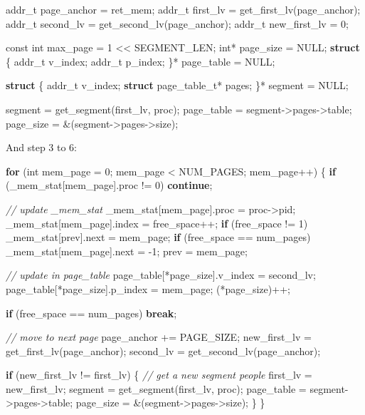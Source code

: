 \documentclass[]{article}
\newenvironment{Shaded}{}{}
\newcommand{\KeywordTok}[1]{\textcolor[rgb]{0.00,0.44,0.13}{\textbf{#1}}}
\newcommand{\DataTypeTok}[1]{\textcolor[rgb]{0.56,0.13,0.00}{#1}}
\newcommand{\DecValTok}[1]{\textcolor[rgb]{0.25,0.63,0.44}{#1}}
\newcommand{\CommentTok}[1]{\textcolor[rgb]{0.38,0.63,0.69}{\textit{#1}}}
\newcommand{\ControlFlowTok}[1]{\textcolor[rgb]{0.00,0.44,0.13}{\textbf{#1}}}
\newcommand{\NormalTok}[1]{#1}
\begin{document}
\begin{Shaded}
\begin{Highlighting}[]
\NormalTok{addr_t page_anchor = ret_mem;}
\NormalTok{addr_t first_lv = get_first_lv(page_anchor);}
\NormalTok{addr_t second_lv = get_second_lv(page_anchor);}
\NormalTok{addr_t new_first_lv = }\DecValTok{0}\NormalTok{;}

\DataTypeTok{const} \DataTypeTok{int}\NormalTok{ max_page = }\DecValTok{1}\NormalTok{ << SEGMENT_LEN;}
\DataTypeTok{int}\NormalTok{* page_size = NULL;}
\KeywordTok{struct}\NormalTok{ \{}
\NormalTok{addr_t v_index;}
\NormalTok{addr_t p_index;}
\NormalTok{\}* page_table = NULL;}

\KeywordTok{struct}\NormalTok{ \{}
\NormalTok{addr_t v_index;}
\KeywordTok{struct}\NormalTok{ page_table_t* pages;}
\NormalTok{\}* segment = NULL;}

\NormalTok{segment = get_segment(first_lv, proc);}
\NormalTok{page_table = segment->pages->table;}
\NormalTok{page_size = &(segment->pages->size);}
\end{Highlighting}
\end{Shaded}

And step 3 to 6:

\begin{Shaded}
\begin{Highlighting}[]
\ControlFlowTok{for}\NormalTok{ (}\DataTypeTok{int}\NormalTok{ mem_page = }\DecValTok{0}\NormalTok{; mem_page < NUM_PAGES; mem_page++) \{}
      \ControlFlowTok{if}\NormalTok{ (_mem_stat[mem_page].proc != }\DecValTok{0}\NormalTok{)}
            \ControlFlowTok{continue}\NormalTok{;}

      \CommentTok{// update _mem_stat}
\NormalTok{      _mem_stat[mem_page].proc = proc->pid;}
\NormalTok{      _mem_stat[mem_page].index = free_space++;}
      \ControlFlowTok{if}\NormalTok{ (free_space != }\DecValTok{1}\NormalTok{)}
\NormalTok{            _mem_stat[prev].next = mem_page;}
      \ControlFlowTok{if}\NormalTok{ (free_space == num_pages)}
\NormalTok{            _mem_stat[mem_page].next = }\DecValTok{-1}\NormalTok{;}
\NormalTok{      prev = mem_page;}

      \CommentTok{// update in page_table}
\NormalTok{      page_table[*page_size].v_index = second_lv;}
\NormalTok{      page_table[*page_size].p_index = mem_page;}
\NormalTok{      (*page_size)++;}

      \ControlFlowTok{if}\NormalTok{ (free_space == num_pages)}
            \ControlFlowTok{break}\NormalTok{;}

      \CommentTok{// move to next page}
\NormalTok{      page_anchor += PAGE_SIZE;}
\NormalTok{      new_first_lv = get_first_lv(page_anchor);}
\NormalTok{      second_lv = get_second_lv(page_anchor);}

      \ControlFlowTok{if}\NormalTok{ (new_first_lv != first_lv) \{}
            \CommentTok{// get a new segment people}
\NormalTok{            first_lv = new_first_lv;}
\NormalTok{            segment = get_segment(first_lv, proc);}
\NormalTok{            page_table = segment->pages->table;}
\NormalTok{            page_size = &(segment->pages->size);}
\NormalTok{      \}}
\NormalTok{\}}
\end{Highlighting}
\end{Shaded}
\end{document}
